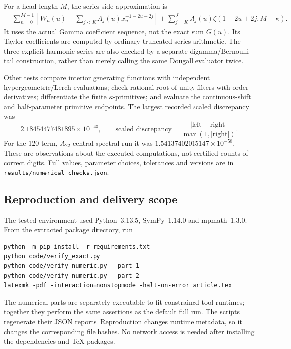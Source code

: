 \documentclass[11pt,letterpaper]{article}
\numberwithin{equation}{section}
\theoremstyle{definition}
\theoremstyle{remark}
\newcommand{\file}[1]{\nolinkurl{#1}}
\begin{document}
For a head length $M$, the series-side approximation is
\begin{align}
 &\sum_{n=0}^{M-1}\left[W_n(u)-\sum_{j<K}A_j(u)x_n^{-1-2u-2j}\right]
 +\sum_{j=K}^{J}A_j(u)\zeta(1+2u+2j,M+\kappa).
 \label{dr:eq:numeric-tail}
\end{align}
It uses the actual Gamma coefficient sequence, not the exact sum $G(u)$.
Its Taylor coefficients are computed by ordinary truncated-series
arithmetic. The three explicit harmonic series are also checked by a
separate digamma/Bernoulli tail construction, rather than merely calling
the same Dougall evaluator twice.

Other tests compare interior generating functions with independent
hypergeometric/Lerch evaluations; check rational root-of-unity filters
with order derivatives; differentiate the finite $\kappa$-primitives;
and evaluate the continuous-shift and half-parameter primitive endpoints.
The largest recorded scaled discrepancy was
\begin{equation}
 2.18454477481895\times10^{-48},\qquad
 \text{scaled discrepancy}=\frac{|\text{left}-\text{right}|}
                                    {\max(1,|\text{right}|)}.
 \label{dr:eq:max-error}
\end{equation}
For the 120-term, $A_{22}$ central spectral run it was
$1.54137402015147\times10^{-58}$. These are observations about the
executed computations, not certified counts of correct digits. Full
values, parameter choices, tolerances and versions are in
\file{results/numerical_checks.json}.

\subsection{Reproduction and delivery scope}

The tested environment used Python~3.13.5, SymPy~1.14.0 and
mpmath~1.3.0. From the extracted package directory, run
\begin{verbatim}
python -m pip install -r requirements.txt
python code/verify_exact.py
python code/verify_numeric.py --part 1
python code/verify_numeric.py --part 2
latexmk -pdf -interaction=nonstopmode -halt-on-error article.tex
\end{verbatim}
The numerical parts are separately executable to fit constrained tool
runtimes; together they perform the same assertions as the default full
run. The scripts regenerate their JSON reports. Reproduction changes
runtime metadata, so it changes the corresponding file hashes. No
network access is needed after installing the dependencies and TeX
packages.
\end{document}
